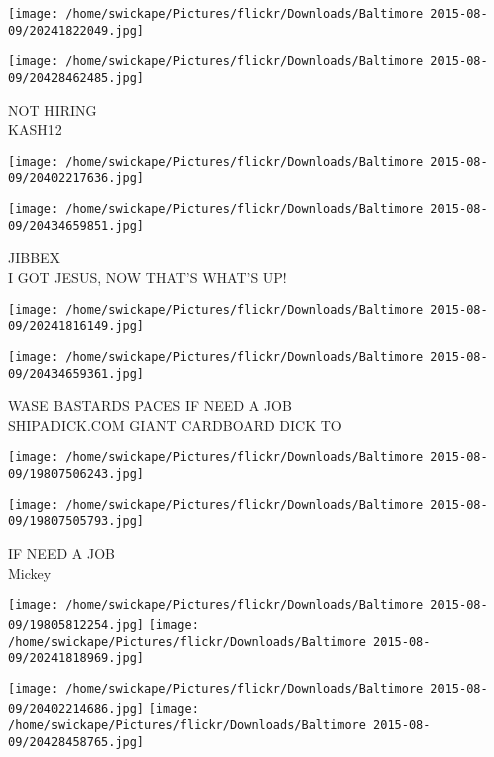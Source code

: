 \documentclass[10pt,letterpaper]{article}
\begin{document}
\texttt{[image: /home/swickape/Pictures/flickr/Downloads/Baltimore 2015-08-09/20241822049.jpg]}

\vspace{0.25in}
\texttt{[image: /home/swickape/Pictures/flickr/Downloads/Baltimore 2015-08-09/20428462485.jpg]}

NOT HIRING\\
KASH12\\
\pagebreak

\texttt{[image: /home/swickape/Pictures/flickr/Downloads/Baltimore 2015-08-09/20402217636.jpg]}

\vspace{0.25in}
\texttt{[image: /home/swickape/Pictures/flickr/Downloads/Baltimore 2015-08-09/20434659851.jpg]}

JIBBEX\\
I GOT JESUS, NOW THAT'S WHAT'S UP!\\
\pagebreak

\texttt{[image: /home/swickape/Pictures/flickr/Downloads/Baltimore 2015-08-09/20241816149.jpg]}

\vspace{0.25in}
\texttt{[image: /home/swickape/Pictures/flickr/Downloads/Baltimore 2015-08-09/20434659361.jpg]}

WASE BASTARDS PACES IF NEED A JOB\\
SHIPADICK.COM GIANT CARDBOARD DICK TO\\
\pagebreak

\texttt{[image: /home/swickape/Pictures/flickr/Downloads/Baltimore 2015-08-09/19807506243.jpg]}

\vspace{0.25in}
\texttt{[image: /home/swickape/Pictures/flickr/Downloads/Baltimore 2015-08-09/19807505793.jpg]}

IF NEED A JOB\\
Mickey\\
\pagebreak

\texttt{[image: /home/swickape/Pictures/flickr/Downloads/Baltimore 2015-08-09/19805812254.jpg]}
\texttt{[image: /home/swickape/Pictures/flickr/Downloads/Baltimore 2015-08-09/20241818969.jpg]}

\texttt{[image: /home/swickape/Pictures/flickr/Downloads/Baltimore 2015-08-09/20402214686.jpg]}
\texttt{[image: /home/swickape/Pictures/flickr/Downloads/Baltimore 2015-08-09/20428458765.jpg]}
\end{document}
